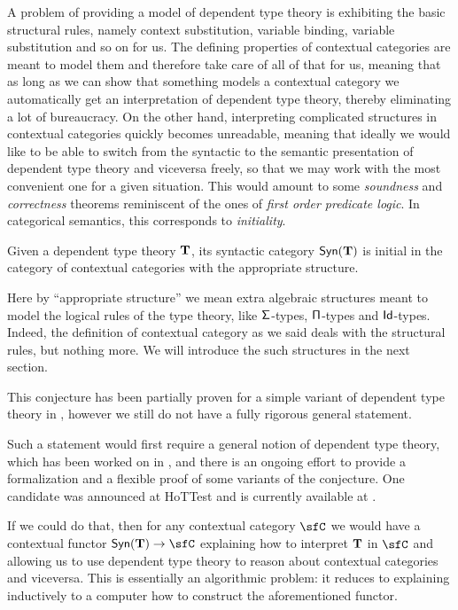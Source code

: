 A problem of providing a model of dependent type theory is exhibiting the
basic structural rules, namely context substitution, variable binding,
variable substitution and so on for us. The defining properties of contextual
categories are meant to model them and therefore 
take care of all of that for us, meaning that as long
as we can show that something models a contextual category we automatically get
an interpretation of dependent type theory, thereby eliminating a lot of
bureaucracy. On the other hand, interpreting complicated structures in
contextual categories quickly becomes unreadable, meaning that ideally we would
like to be able to switch from the syntactic to the semantic presentation of
dependent type theory and viceversa freely, so that we may work with the most
convenient one for a given situation. This would amount to some \emph{soundness}
and \emph{correctness} theorems reminiscent of the ones of \emph{first order
predicate logic}. In categorical semantics, this corresponds to
\emph{initiality}.

\begin{named}[Initiality]
  Given a dependent type theory $\operatorname{\mathbf{T}}$, its syntactic category $\mathsf{Syn}(\mathbf{\operatorname{\mathbf{T}}})$ is
  initial in the category of contextual categories with the appropriate
  structure.
\end{named}

\begin{rmk}
Here by ``appropriate structure'' we mean extra algebraic structures meant to
model the
logical rules of the type theory, like $\operatorname{\mathsf{\Sigma}}$-types, $\operatorname{\mathsf{\Pi}}$-types and
$\operatorname{\mathsf{Id}}$-types. Indeed, the definition of contextual category as we said deals with
the structural rules, but nothing more. We will introduce the such structures in
the next section.
\end{rmk}

\begin{rmk}
This conjecture has been partially proven for a simple variant of dependent type
theory in \cite{Str91}, however we still do not have a fully rigorous general
statement.

Such a statement would first require a general notion of dependent type theory,
which has been worked on in \cite{Isa17, Uem19, Bru20, BHL20, NU22}, and
there is an ongoing effort to provide a formalization and a flexible proof of
some variants of the conjecture. One candidate was announced at HoTTest
\cite{BL20} and is currently available at \cite{Bru20}.

If we could do that, then for any contextual category $\sfC$ we would have a
contextual functor $\Syn{\T}\rightarrow\sfC$ explaining how to interpret $\operatorname{\mathbf{T}}$ in
$\sfC$ and allowing us to use dependent type theory to reason about contextual
categories and viceversa. This is essentially an algorithmic problem: it reduces
to explaining inductively to a computer how to construct the aforementioned
functor.
\end{rmk}

